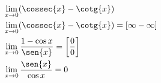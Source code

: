 \begin{ex}
\begin{align}
&\lim_{x\rightarrow 0} (\cossec{x}-\cotg{x})\nonumber\\
&\lim_{x\rightarrow 0} (\cossec{x}-\cotg{x})= [\infty-\infty]\nonumber\\
&\lim_{x\rightarrow 0} \frac{1-\cos{x}}{\sen{x}}=\left[\frac{0}{0}\right]\nonumber\\
&\lim_{x\rightarrow 0} \frac{\sen{x}}{\cos{x}}=0\nonumber
\end{align}
\end{ex}
